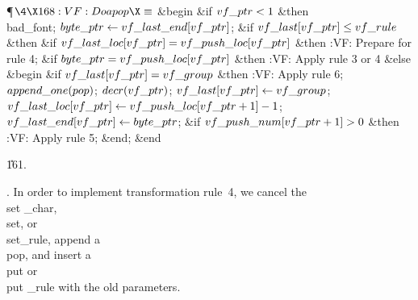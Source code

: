 \Y\P$\4\X168:VF: Do a \\{pop}\X\S$\6
\&{begin} \&{if} $\\{vf\_ptr}<1$ \1\&{then}\5
\\{bad\_font};\2\6
$\\{byte\_ptr}\gets\\{vf\_last\_end}[\\{vf\_ptr}]$;\6
\&{if} $\\{vf\_last}[\\{vf\_ptr}]\le\\{vf\_rule}$ \1\&{then}\6
\&{if} $\\{vf\_last\_loc}[\\{vf\_ptr}]=\\{vf\_push\_loc}[\\{vf\_ptr}]$ \1%
\&{then}\5
:VF: Prepare for rule 4\X;\2\2\6
\&{if} $\\{byte\_ptr}=\\{vf\_push\_loc}[\\{vf\_ptr}]$ \1\&{then}\5
:VF: Apply rule 3 or 4\X\6
\4\&{else} \&{begin} \&{if} $\\{vf\_last}[\\{vf\_ptr}]=\\{vf\_group}$ \1%
\&{then}\5
:VF: Apply rule 6\X;\2\6
$\\{append\_one}(\\{pop})$;\5
$\\{decr}(\\{vf\_ptr})$;\5
$\\{vf\_last}[\\{vf\_ptr}]\gets\\{vf\_group}$;\5
$\\{vf\_last\_loc}[\\{vf\_ptr}]\gets\\{vf\_push\_loc}[\\{vf\_ptr}+1]-1$;\5
$\\{vf\_last\_end}[\\{vf\_ptr}]\gets\\{byte\_ptr}$;\6
\&{if} $\\{vf\_push\_num}[\\{vf\_ptr}+1]>0$ \1\&{then}\5
:VF: Apply rule 5\X;\2\6
\&{end};\2\6
\&{end}\par
\U161.\fi

. In order to implement transformation rule~4, we cancel the \\{set%
\_char},
\\{set}, or \\{set\_rule}, append a \\{pop}, and insert a \\{put} or \\{put%
\_rule}
with the old parameters.

